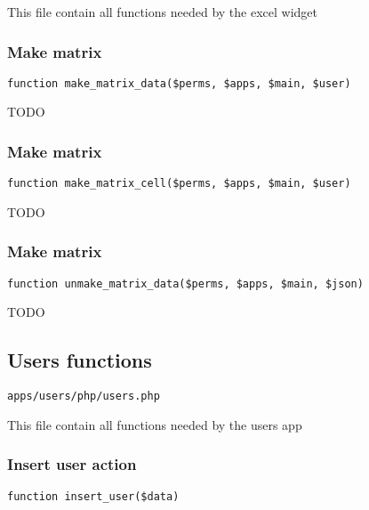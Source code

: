 \documentclass[a4paper]{article}
\begin{document}
This file contain all functions needed by the excel widget

\hypertarget{toc169}{}
\subsubsection{Make matrix}

\begin{lstlisting}
function make_matrix_data($perms, $apps, $main, $user)
\end{lstlisting}

TODO

\hypertarget{toc170}{}
\subsubsection{Make matrix}

\begin{lstlisting}
function make_matrix_cell($perms, $apps, $main, $user)
\end{lstlisting}

TODO

\hypertarget{toc171}{}
\subsubsection{Make matrix}

\begin{lstlisting}
function unmake_matrix_data($perms, $apps, $main, $json)
\end{lstlisting}

TODO

\hypertarget{toc172}{}
\subsection{Users functions}

\begin{lstlisting}
apps/users/php/users.php
\end{lstlisting}

This file contain all functions needed by the users app

\hypertarget{toc173}{}
\subsubsection{Insert user action}

\begin{lstlisting}
function insert_user($data)
\end{lstlisting}
\end{document}
